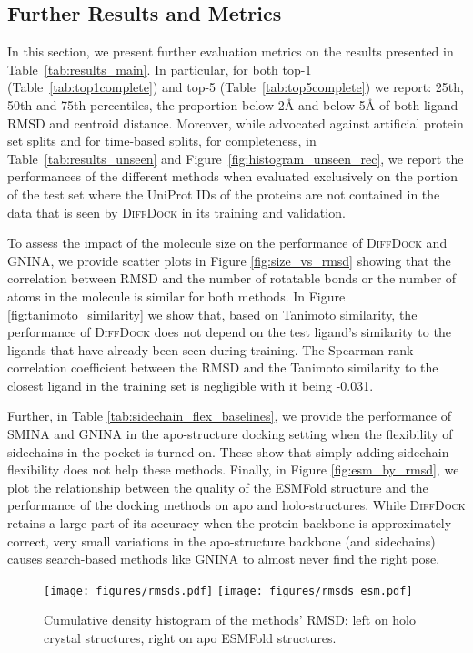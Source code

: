 \documentclass{article} \usepackage{iclr2023_conference,times}
\begin{document}
\subsection{Further Results and Metrics}

In this section, we present further evaluation metrics on the results presented in Table~\ref{tab:results_main}. In particular, for both top-1 (Table~\ref{tab:top1complete}) and top-5 (Table~\ref{tab:top5complete}) we report: 25th, 50th and 75th percentiles, the proportion below 2\AA{} and below 5\AA{} of both ligand RMSD and centroid distance. Moreover, while \citet{Volkov2022PDBBindSplits} advocated against artificial protein set splits and for time-based splits, for completeness, in Table~\ref{tab:results_unseen} and Figure~\ref{fig:histogram_unseen_rec}, we report the performances of the different methods when evaluated exclusively on the portion of the test set where the UniProt IDs of the proteins are not contained in the data that is seen by \textsc{DiffDock} in its training and validation. 

To assess the impact of the molecule size on the performance of \textsc{DiffDock} and GNINA, we provide scatter plots in Figure \ref{fig:size_vs_rmsd} showing that the correlation between RMSD and the number of rotatable bonds or the number of atoms in the molecule is similar for both methods. In Figure \ref{fig:tanimoto_similarity} we show that, based on Tanimoto similarity, the performance of \textsc{DiffDock} does not depend on the test ligand's similarity to the ligands that have already been seen during training. The Spearman rank correlation coefficient between the RMSD and the Tanimoto similarity to the closest ligand in the training set is negligible with it being -0.031.

Further, in Table \ref{tab:sidechain_flex_baselines}, we provide the performance of SMINA and GNINA in the apo-structure docking setting when the flexibility of sidechains in the pocket is turned on. These show that simply adding sidechain flexibility does not help these methods. Finally, in Figure \ref{fig:esm_by_rmsd}, we plot the relationship between the quality of the ESMFold structure and the performance of the docking methods on apo and holo-structures. While \textsc{DiffDock} retains a large part of its accuracy when the protein backbone is approximately correct, very small variations in the apo-structure backbone (and sidechains) causes search-based methods like GNINA to almost never find the right pose.

\vspace{-6pt}
\begin{figure}[htb]
\begin{center}
\texttt{[image: figures/rmsds.pdf]}
\hspace{5pt}
\texttt{[image: figures/rmsds\_esm.pdf]}
\vspace{-6pt}
\caption{Cumulative density histogram of the methods' RMSD: left on holo crystal structures, right on apo ESMFold structures. } 
\label{fig:cum_densities}
\end{center}
 \vskip -0.1cm
\end{figure}
\end{document}
